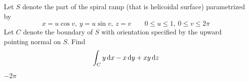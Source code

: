 \begin{question}
Let $S$ denote the part of the spiral ramp (that is helicoidal
surface) parametrized by 
\begin{equation*}
x=u\cos v,\ y=u\sin v,\ z=v\qquad
0\le u\le 1,\ 0\le v\le 2\pi
\end{equation*}
Let $C$ denote the boundary of $S$
with orientation specified by the upward pointing normal on $S$. Find
\begin{equation*}
\int_C y\,\mathrm{d}x-x\,\mathrm{d}y+ xy\,\mathrm{d}z
\end{equation*}
\end{question}


\begin{answer} 
$-2\pi$
\end{answer}

